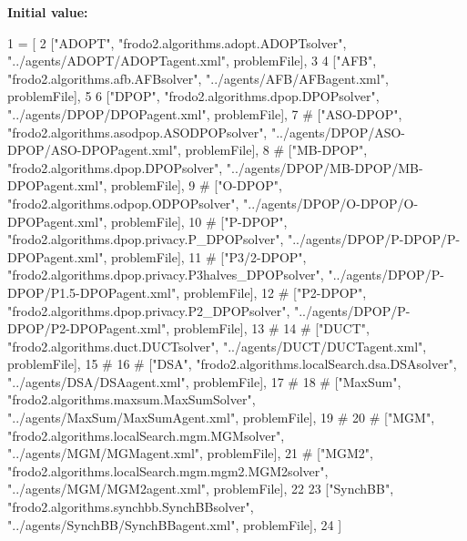 {\bfseries Initial value\+:}
\begin{DoxyCode}
1 =  [
2         [\textcolor{stringliteral}{"ADOPT"}, \textcolor{stringliteral}{"frodo2.algorithms.adopt.ADOPTsolver"}, \textcolor{stringliteral}{"../agents/ADOPT/ADOPTagent.xml"}, problemFile], 
3 
4         [\textcolor{stringliteral}{"AFB"}, \textcolor{stringliteral}{"frodo2.algorithms.afb.AFBsolver"}, \textcolor{stringliteral}{"../agents/AFB/AFBagent.xml"}, problemFile], 
5 
6         [\textcolor{stringliteral}{"DPOP"}, \textcolor{stringliteral}{"frodo2.algorithms.dpop.DPOPsolver"}, \textcolor{stringliteral}{"../agents/DPOP/DPOPagent.xml"}, problemFile], 
7 \textcolor{comment}{#         ["ASO-DPOP", "frodo2.algorithms.asodpop.ASODPOPsolver",
       "../agents/DPOP/ASO-DPOP/ASO-DPOPagent.xml", problemFile], }
8 \textcolor{comment}{#         ["MB-DPOP", "frodo2.algorithms.dpop.DPOPsolver", "../agents/DPOP/MB-DPOP/MB-DPOPagent.xml",
       problemFile], }
9 \textcolor{comment}{#          ["O-DPOP", "frodo2.algorithms.odpop.ODPOPsolver", "../agents/DPOP/O-DPOP/O-DPOPagent.xml",
       problemFile], }
10 \textcolor{comment}{#          ["P-DPOP", "frodo2.algorithms.dpop.privacy.P\_DPOPsolver",
       "../agents/DPOP/P-DPOP/P-DPOPagent.xml", problemFile], }
11 \textcolor{comment}{#          ["P3/2-DPOP", "frodo2.algorithms.dpop.privacy.P3halves\_DPOPsolver",
       "../agents/DPOP/P-DPOP/P1.5-DPOPagent.xml", problemFile], }
12 \textcolor{comment}{#         ["P2-DPOP", "frodo2.algorithms.dpop.privacy.P2\_DPOPsolver",
       "../agents/DPOP/P-DPOP/P2-DPOPagent.xml", problemFile], }
13 \textcolor{comment}{# }
14 \textcolor{comment}{#       ["DUCT", "frodo2.algorithms.duct.DUCTsolver", "../agents/DUCT/DUCTagent.xml", problemFile], }
15 \textcolor{comment}{#}
16 \textcolor{comment}{#         ["DSA", "frodo2.algorithms.localSearch.dsa.DSAsolver", "../agents/DSA/DSAagent.xml",
       problemFile], }
17 \textcolor{comment}{# }
18 \textcolor{comment}{#         ["MaxSum", "frodo2.algorithms.maxsum.MaxSumSolver", "../agents/MaxSum/MaxSumAgent.xml",
       problemFile], }
19 \textcolor{comment}{# }
20 \textcolor{comment}{#         ["MGM", "frodo2.algorithms.localSearch.mgm.MGMsolver", "../agents/MGM/MGMagent.xml",
       problemFile], }
21 \textcolor{comment}{#         ["MGM2", "frodo2.algorithms.localSearch.mgm.mgm2.MGM2solver", "../agents/MGM/MGM2agent.xml",
       problemFile], }
22 
23         [\textcolor{stringliteral}{"SynchBB"}, \textcolor{stringliteral}{"frodo2.algorithms.synchbb.SynchBBsolver"}, \textcolor{stringliteral}{"../agents/SynchBB/SynchBBagent.xml"}, 
      problemFile], 
24         ]
\end{DoxyCode}
\mbox{\label{namespaceMaxDisCSP__experiment_aaba77ea389ee9c9f69d9d4c5979a17b1}} 
